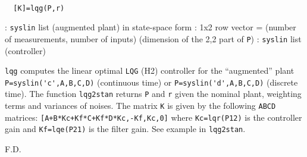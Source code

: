 \begin{mandesc}
   \\ %
\end{mandesc}
\begin{calling_sequence}
\begin{verbatim}
  [K]=lqg(P,r)  
\end{verbatim}
\end{calling_sequence}
\begin{parameters}
  \begin{varlist}
    : \verb!syslin! list (augmented plant) in state-space form
    : 1x2 row vector = (number of measurements, number of inputs)
    (dimension of the 2,2 part of \verb!P!)
    : \verb!syslin! list (controller)
  \end{varlist}
\end{parameters}
\begin{mandescription}
  \verb!lqg!  computes the linear optimal \verb+LQG+ (H2) controller for the
  ``augmented'' plant \verb!P=syslin('c',A,B,C,D)! (continuous time) or
  \verb!P=syslin('d',A,B,C,D)! (discrete time).  The function \verb!lqg2stan!
  returns \verb!P! and \verb!r! given the nominal plant, weighting terms and
  variances of noises. The matrix \verb!K! is given by the following \verb+ABCD+ matrices:
  \verb![A+B*Kc+Kf*C+Kf*D*Kc,-Kf,Kc,0]! where \verb!Kc=lqr(P12)!  is the
  controller gain and \verb!Kf=lqe(P21)! is the filter gain.  See example in
  \verb!lqg2stan!.
\end{mandescription}
\begin{manseealso}
        
\end{manseealso}
\begin{authors}
  F.D.  
\end{authors}
